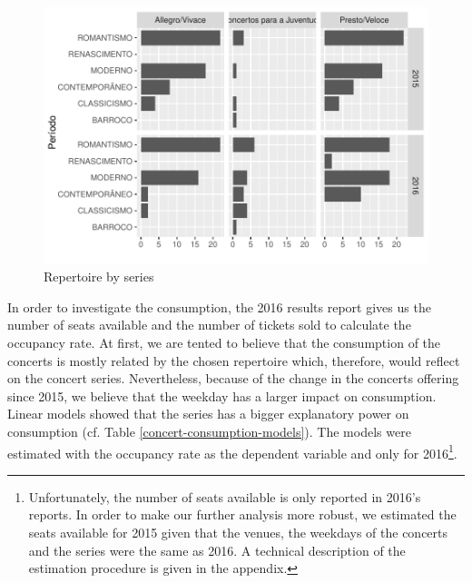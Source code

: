 \documentclass[a4paper, 12pt, openright, oneside, german, french, brazil, english]{abntex2}
\begin{document}
        \begin{figure}[!h]
          \centering
          \caption{Repertoire by series}
          \label{repertoire-perseries}
          \includegraphics[scale=1]{periodo_perserie_year.pdf}
        \end{figure}


        In order to investigate the consumption, the 2016 results report gives us the number of seats available and the number of tickets sold to calculate the occupancy rate. At first, we are tented to believe that the consumption of the concerts is mostly related by the chosen repertoire which, therefore, would reflect on the concert series. Nevertheless, because of the change in the concerts offering since 2015, we believe that the weekday has a larger impact on consumption. Linear models showed that the series has a bigger explanatory power on consumption (cf. Table \ref{concert-consumption-models}). The models were estimated with the occupancy rate as the dependent variable and only for 2016\footnote{Unfortunately, the number of seats available is only reported in 2016's reports. In order to make our further analysis more robust, we estimated the seats available for 2015 given that the venues, the weekdays of the concerts and the series were the same as 2016. A technical description of the estimation procedure is given in the appendix.}.
\end{document}
